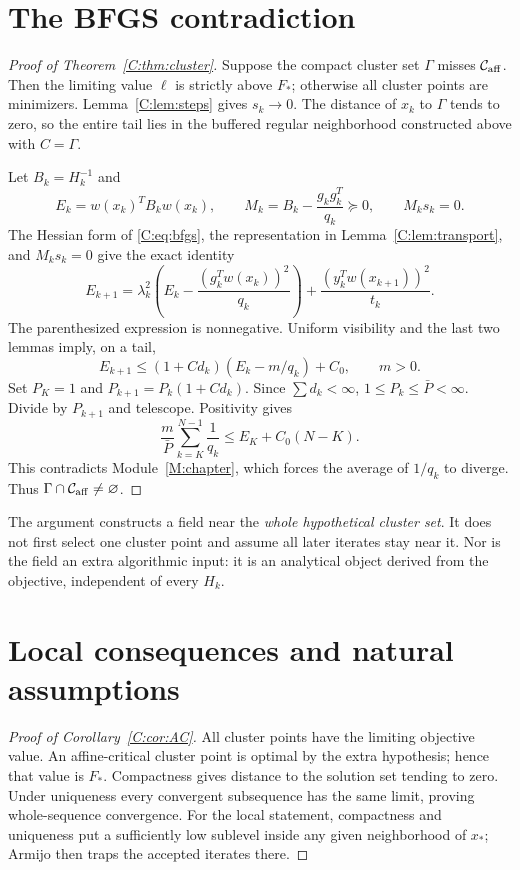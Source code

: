 \documentclass[10pt,oneside,openany]{book}
\theoremstyle{remark}\newtheorem{remark}{Remark}[chapter]
\begin{document}
\section{The BFGS contradiction}
\begin{proof}[Proof of Theorem~\ref{C:thm:cluster}]
Suppose the compact cluster set $\Gamma$ misses $\mathcal C_{\rm aff}$. Then the limiting value $\ell$ is strictly above $F_*$; otherwise all cluster points are minimizers. Lemma~\ref{C:lem:steps} gives $s_k\to0$. The distance of $x_k$ to $\Gamma$ tends to zero, so the entire tail lies in the buffered regular neighborhood constructed above with $C=\Gamma$.

Let $B_k=H_k^{-1}$ and
\[
 E_k=w(x_k)^TB_kw(x_k),\qquad
 M_k=B_k-\frac{g_kg_k^T}{q_k}\succeq0,\qquad M_ks_k=0.
\]
The Hessian form of \eqref{C:eq:bfgs}, the representation in Lemma~\ref{C:lem:transport}, and $M_ks_k=0$ give the exact identity
\begin{equation}\label{C:eq:energy}
 E_{k+1}=\lambda_k^2\left(E_k-\frac{(g_k^Tw(x_k))^2}{q_k}\right)
       +\frac{(y_k^Tw(x_{k+1}))^2}{t_k}.
\end{equation}
The parenthesized expression is nonnegative. Uniform visibility and the last two lemmas imply, on a tail,
\[
 E_{k+1}\le (1+C d_k)(E_k-m/q_k)+C_0,
 \qquad m>0.
\]
Set $P_K=1$ and $P_{k+1}=P_k(1+Cd_k)$. Since $\sum d_k<\infty$, $1\le P_k\le\bar P<\infty$. Divide by $P_{k+1}$ and telescope. Positivity gives
\[
 \frac{m}{\bar P}\sum_{k=K}^{N-1}\frac1{q_k}
 \le E_K+C_0(N-K).
\]
This contradicts Module~\ref{M:chapter}, which forces the average of $1/q_k$ to diverge. Thus $\Gamma\cap\mathcal C_{\rm aff}\ne\varnothing$.
\end{proof}

The argument constructs a field near the \emph{whole hypothetical cluster set}. It does not first select one cluster point and assume all later iterates stay near it. Nor is the field an extra algorithmic input: it is an analytical object derived from the objective, independent of every $H_k$.


\setcounter{section}{6}
\setcounter{theorem}{7}
\setcounter{equation}{16}
\section{Local consequences and natural assumptions}
\begin{proof}[Proof of Corollary~\ref{C:cor:AC}]
All cluster points have the limiting objective value. An affine-critical cluster point is optimal by the extra hypothesis; hence that value is $F_*$. Compactness gives distance to the solution set tending to zero. Under uniqueness every convergent subsequence has the same limit, proving whole-sequence convergence. For the local statement, compactness and uniqueness put a sufficiently low sublevel inside any given neighborhood of $x_*$; Armijo then traps the accepted iterates there.
\end{proof}
\end{document}
